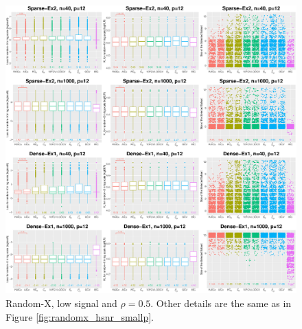 \begin{figure}[!ht]
  \centering
  \includegraphics[width=\textwidth]{figures/main/randomx/subset_selection/smallp_lsnr.eps}
  \caption{Random-X, low signal and $\rho=0.5$. Other details are the same as in Figure \ref{fig:randomx_hsnr_smallp}.}
  \label{fig:subsetselection_randomx_lsnr_smallp}
\end{figure}
\fi

